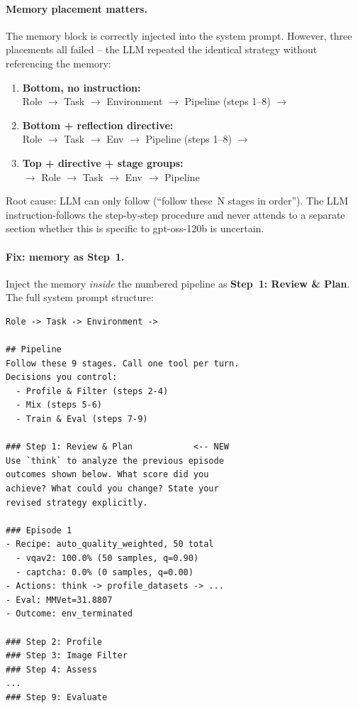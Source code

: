 \paragraph{Memory placement matters.}
The memory block is correctly injected into the system prompt.
However, three placements all failed -- the LLM repeated the identical strategy without referencing the memory:

\begin{enumerate}
    \item \textbf{Bottom, no instruction:}\\
    {\small\ttfamily Role $\to$ Task $\to$ Environment $\to$ Pipeline (steps 1--8) $\to$ }
    \item \textbf{Bottom + reflection directive:}\\
    {\small\ttfamily Role $\to$ Task $\to$ Env $\to$ Pipeline (steps 1--8) $\to$ }
    \item \textbf{Top + directive + stage groups:}\\
    {\small\ttfamily {} $\to$ Role $\to$ Task $\to$ Env $\to$ Pipeline}
\end{enumerate}

\noindent Root cause: LLM can only follow (``follow these~N stages in order'').
The LLM instruction-follows the step-by-step procedure and never attends to a separate section whether this is specific to gpt-oss-120b is uncertain.

\paragraph{Fix: memory as Step~1.}
Inject the memory \emph{inside} the numbered pipeline as \textbf{Step~1: Review \& Plan}.
The full system prompt structure:

\begin{verbatim}
Role -> Task -> Environment ->

## Pipeline
Follow these 9 stages. Call one tool per turn.
Decisions you control:
  - Profile & Filter (steps 2-4)
  - Mix (steps 5-6)
  - Train & Eval (steps 7-9)

### Step 1: Review & Plan            <-- NEW
Use `think` to analyze the previous episode
outcomes shown below. What score did you
achieve? What could you change? State your
revised strategy explicitly.

### Episode 1
- Recipe: auto_quality_weighted, 50 total
  - vqav2: 100.0% (50 samples, q=0.90)
  - captcha: 0.0% (0 samples, q=0.00)
- Actions: think -> profile_datasets -> ...
- Eval: MMVet=31.8807
- Outcome: env_terminated

### Step 2: Profile
### Step 3: Image Filter
### Step 4: Assess
...
### Step 9: Evaluate
\end{verbatim}

